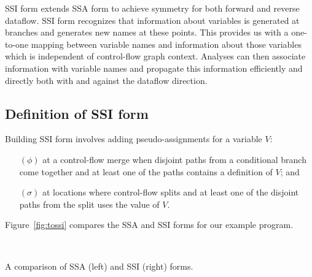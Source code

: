 \documentclass[12pt,titlepage]{article}
\begin{document}
SSI form extends SSA form to achieve symmetry for both forward and
reverse dataflow.   SSI form recognizes that information about
variables is generated at branches and generates new names at these
points.  This provides us with a one-to-one mapping between variable
names and information about those variables which is independent of
control-flow graph context.  Analyses can then associate information
with variable names and propagate this information efficiently and
directly both with and against the dataflow direction.

\subsection{Definition of SSI form}
Building SSI form involves adding pseudo-assignments for a variable $V$:
\begin{enumerate}
\item[$(\phi)$] at a control-flow merge when disjoint paths from a
conditional branch come together and at least one of the paths
contains a definition of $V$; and
\item[$(\sigma)$] at locations where control-flow splits and at least
one of the disjoint paths from the split uses the value of $V$.
\end{enumerate}

Figure~\vref{fig:tossi} compares the SSA and SSI forms for our example program.
\begin{myfigure}
\begin{center}
 \vline\ 
\end{center}
\caption[A comparison of SSA and SSI forms.]
{A comparison of SSA (left) and SSI (right) forms.}
\label{fig:tossi}
\end{myfigure}
\end{document}
